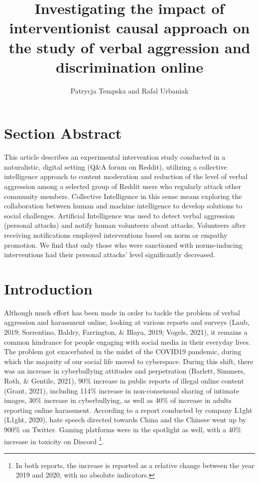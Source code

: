 \documentclass[
  10pt,
  dvipsnames,enabledeprecatedfontcommands]{scrartcl}
\title{Investigating the impact of interventionist causal approach on
the study of verbal aggression and discrimination online}
\author{Patrycja Tempska and Rafal Urbaniak}
\date{}
\begin{document}
\maketitle

\tableofcontents

\hypertarget{section-abstract}{%
\section{Section Abstract}\label{section-abstract}}

This article describes an experimental intervention study conducted in a
naturalistic, digital setting (Q\&A forum on Reddit), utilizing a
collective intelligence approach to content moderation and reduction of
the level of verbal aggression among a selected group of Reddit users
who regularly attack other community members. Collective Intelligence in
this sense means exploring the collaboration between human and machine
intelligence to develop solutions to social challenges. Artificial
Intelligence was used to detect verbal aggression (personal attacks) and
notify human volunteers about attacks. Volunteers after receiving
notifications employed interventions based on norm or empathy promotion.
We find that only those who were sanctioned with norms-inducing
interventions had their personal attacks' level significantly decreased.

\vspace{1mm}
\footnotesize

\normalsize

\hypertarget{introduction}{%
\section{Introduction}\label{introduction}}

Although much effort has been made in order to tackle the problem of
verbal aggression and harassment online, looking at various reports and
surveys (Laub, 2019; Sorrentino, Baldry, Farrington, \& Blaya, 2019;
Vogels, 2021), it remains a common hindrance for people engaging with
social media in their everyday lives. The problem got exacerbated in the
midst of the COVID19 pandemic, during which the majority of our social
life moved to cyberspace. During this shift, there was an increase in
cyberbullying attitudes and perpetration (Barlett, Simmers, Roth, \&
Gentile, 2021), 90\% increase in public reports of illegal online
content (Grant, 2021), including 114\% increase in non-consensual
sharing of intimate images, 30\% increase in cyberbullying, as well as
40\% of increase in adults reporting online harassment. According to a
report conducted by company L1ght (L1ght, 2020), hate speech directed
towards China and the Chinese went up by 900\% on Twitter. Gaming
platforms were in the spotlight as well, with a 40\% increase in
toxicity on Discord
\footnote{In both reports, the increase is reported as a relative change between the year 2019 and 2020, with no absolute indicators.}.
\end{document}
